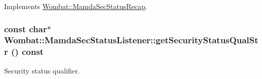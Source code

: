 Implements \hyperlink{classWombat_1_1MamdaSecStatusRecap_4f195cb017b796ba8d82cd3c3b1c1504}{Wombat::Mamda\-Sec\-Status\-Recap}.\hypertarget{classWombat_1_1MamdaSecStatusListener_4e5aae3d78147807618e44d3bfe96275}{
\subsubsection[getSecurityStatusQualStr]{\setlength{\rightskip}{0pt plus 5cm}const char$\ast$ Wombat::Mamda\-Sec\-Status\-Listener::get\-Security\-Status\-Qual\-Str () const}}
\label{classWombat_1_1MamdaSecStatusListener_4e5aae3d78147807618e44d3bfe96275}


Security status qualifier. 

